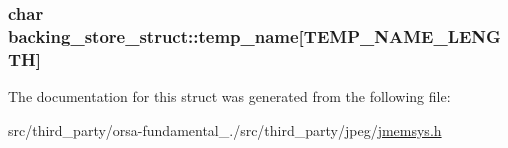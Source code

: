 \subsubsection[{temp\+\_\+name}]{\setlength{\rightskip}{0pt plus 5cm}char backing\+\_\+store\+\_\+struct\+::temp\+\_\+name\mbox{[}{\bf T\+E\+M\+P\+\_\+\+N\+A\+M\+E\+\_\+\+L\+E\+N\+G\+T\+H}\mbox{]}}\label{structbacking__store__struct_aee24b7268410bcf129e83a8e2a2f4d45}


The documentation for this struct was generated from the following file\+:\begin{DoxyCompactItemize}
\item 
src/third\+\_\+party/orsa-\/fundamental\+\_./src/third\+\_\+party/jpeg/\hyperlink{jmemsys_8h}{jmemsys.\+h}\end{DoxyCompactItemize}
